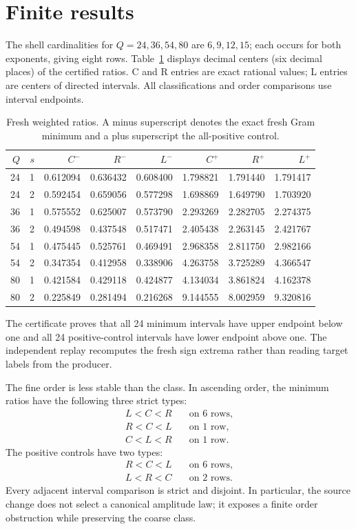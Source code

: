 \documentclass[10pt,a4paper]{article}
\begin{document}
\section{Finite results}

The shell cardinalities for $Q=24,36,54,80$ are $6,9,12,15$; each occurs for
both exponents, giving eight rows.  Table~\ref{tab:ratios} displays decimal
centers (six decimal places) of the certified ratios.  C and R entries are
exact rational values; L entries are centers of directed intervals.  All
classifications and order comparisons use interval endpoints.

\begin{table}[t]
\centering
\setlength{\tabcolsep}{3.2pt}
\scriptsize
\caption{Fresh weighted ratios.  A minus superscript denotes the exact fresh
Gram minimum and a plus superscript the all-positive control.}
\label{tab:ratios}
\begin{tabular}{rr|rrr|rrr}
\toprule
$Q$ & $s$ & $C^-$ & $R^-$ & $L^-$ & $C^+$ & $R^+$ & $L^+$\\
\midrule
24&1&0.612094&0.636432&0.608400&1.798821&1.791440&1.791417\\
24&2&0.592454&0.659056&0.577298&1.698869&1.649790&1.703920\\
36&1&0.575552&0.625007&0.573790&2.293269&2.282705&2.274375\\
36&2&0.494598&0.437548&0.517471&2.405438&2.263145&2.421767\\
54&1&0.475445&0.525761&0.469491&2.968358&2.811750&2.982166\\
54&2&0.347354&0.412958&0.338906&4.263758&3.725289&4.366547\\
80&1&0.421584&0.429118&0.424877&4.134034&3.861824&4.162378\\
80&2&0.225849&0.281494&0.216268&9.144555&8.002959&9.320816\\
\bottomrule
\end{tabular}
\end{table}

The certificate proves that all 24 minimum intervals have upper endpoint
below one and all 24 positive-control intervals have lower endpoint above
one.  The independent replay recomputes the fresh sign extrema rather than
reading target labels from the producer.

The fine order is less stable than the class.  In ascending order, the
minimum ratios have the following three strict types:
\begin{align*}
 L<C<R &\quad\text{on 6 rows},\\
 R<C<L &\quad\text{on 1 row},\\
 C<L<R &\quad\text{on 1 row}.
\end{align*}
The positive controls have two types:
\begin{align*}
 R<C<L &\quad\text{on 6 rows},\\
 L<R<C &\quad\text{on 2 rows}.
\end{align*}
Every adjacent interval comparison is strict and disjoint.  In particular,
the source change does not select a canonical amplitude law; it exposes a
finite order obstruction while preserving the coarse class.
\end{document}
